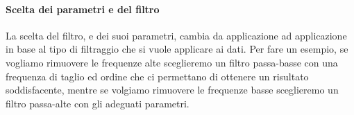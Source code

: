 \paragraph{Scelta dei parametri e del filtro}
La scelta del filtro, e dei suoi parametri, cambia da applicazione ad applicazione in base al tipo di 
filtraggio che si vuole applicare ai dati. Per fare un esempio, se vogliamo rimuovere le frequenze alte
sceglieremo un filtro passa-basse con una frequenza di taglio ed ordine che ci permettano di ottenere
un risultato soddisfacente, mentre se volgiamo rimuovere le frequenze basse sceglieremo un filtro
passa-alte con gli adeguati parametri.


